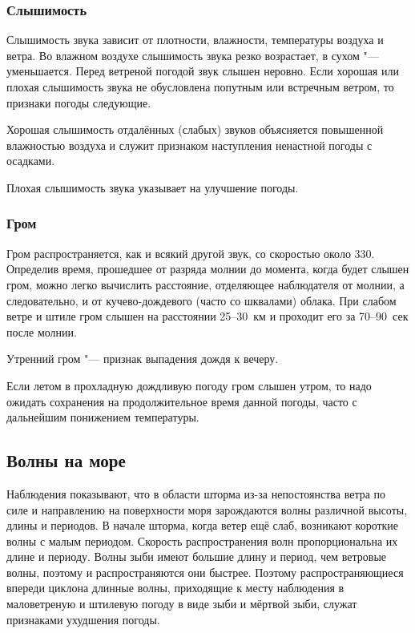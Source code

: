 \subsubsection{Слышимость}

Слышимость звука зависит от плотности, влажности, температуры воздуха
и ветра. Во влажном воздухе слышимость звука резко возрастает, в сухом
"--- уменьшается. Перед ветреной погодой звук слышен неровно. Если
хорошая или плохая слышимость звука не обусловлена попутным или
встречным ветром, то признаки погоды следующие.

 Хорошая слышимость отдалённых (слабых) звуков объясняется
повышенной влажностью воздуха и служит признаком наступления ненастной
погоды с осадками.

 Плохая слышимость звука указывает на улучшение погоды.

\subsubsection{Гром}

Гром распространяется, как и всякий другой звук, со скоростью около
330\speedms. Определив время, прошедшее от разряда молнии до момента,
когда будет слышен гром, можно легко вычислить расстояние, отделяющее
наблюдателя от молнии, а следовательно, и от кучево-дождевого (часто
со шквалами) облака. При слабом ветре и штиле гром слышен на
расстоянии 25--30~км и проходит его за 70--90~сек после молнии.

 Утренний гром "--- признак выпадения дождя к вечеру.

 Если летом в прохладную дождливую погоду гром слышен утром, то
надо ожидать сохранения на продолжительное время данной погоды, часто
с дальнейшим понижением температуры.

\subsection{Волны на море}\label{sec:waves_on_sea}

Наблюдения показывают, что в области шторма из-за непостоянства ветра
по силе и направлению на поверхности моря зарождаются волны различной
высоты, длины и периодов. В начале шторма, когда ветер ещё слаб,
возникают короткие волны с малым периодом. Скорость распространения
волн пропорциональна их длине и периоду. Волны зыби имеют большие
длину и период, чем ветровые волны, поэтому и распространяются они
быстрее. Поэтому распространяющиеся впереди циклона длинные волны,
приходящие к месту наблюдения в маловетреную и штилевую погоду в виде
зыби и мёртвой зыби, служат признаками ухудшения погоды.


